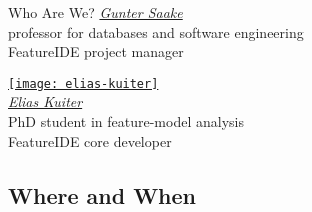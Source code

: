 \begin{frame}{\myframetitle}
\begin{fancycolumns}
{\begin{note}{Who Are We?}
{					\href{https://www.dbse.ovgu.de/Mitarbeiter/Gunter+Saake.html}{\emph{Gunter Saake}}\\[.5ex]
					\small professor for databases and software engineering\\[.5ex]
					FeatureIDE project manager
				}
				\parbox{0.45\linewidth}{
					\centering
					\href{https://www.dbse.ovgu.de/Mitarbeiter/Elias+Kuiter.html}{\texttt{[image: elias-kuiter]}}\\[.5ex]
					\href{https://www.dbse.ovgu.de/Mitarbeiter/Elias+Kuiter.html}{\emph{Elias Kuiter}}\\[.5ex]
					\small PhD student in feature-model analysis\\[.5ex]
					FeatureIDE core developer
				}
			\end{note}
		}
	\end{fancycolumns}
\end{frame}

\subsection{Where and When}

